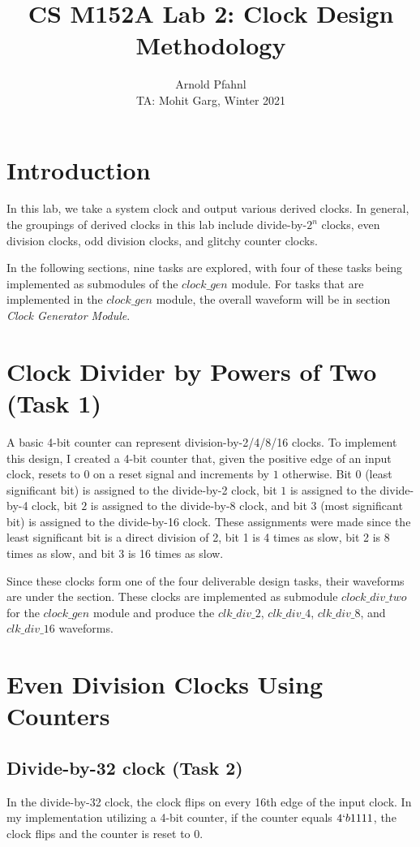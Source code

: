 \documentclass{article}
\title{CS M152A Lab 2: Clock Design Methodology}
\author{Arnold Pfahnl \\ \small{TA: Mohit Garg, Winter 2021}}
\date{}
\begin{document}
\maketitle
\tableofcontents

\section{Introduction}
In this lab, we take a system clock and output various derived clocks. In general, the groupings of derived clocks in this lab include divide-by-$2^n$ clocks, even division clocks, odd division clocks, and glitchy counter clocks.

In the following sections, nine tasks are explored, with four of these tasks being implemented as submodules of the $clock\_gen$ module. For tasks that are implemented in the $clock\_gen$ module, the overall waveform will be in section \emph{Clock Generator Module}.

\section{Clock Divider by Powers of Two (Task 1)}\label{sec:clk2}
A basic 4-bit counter can represent division-by-2/4/8/16 clocks. To implement this design, I created a 4-bit counter that, given the positive edge of an input clock, resets to $0$ on a reset signal and increments by $1$ otherwise. Bit $0$ (least significant bit) is assigned to the divide-by-2 clock, bit $1$ is assigned to the divide-by-4 clock, bit $2$ is assigned to the divide-by-8 clock, and bit $3$ (most significant bit) is assigned to the divide-by-16 clock. These assignments were made since the least significant bit is a direct division of 2, bit 1 is 4 times as slow, bit 2 is 8 times as slow, and bit 3 is 16 times as slow.

Since these clocks form one of the four deliverable design tasks, their waveforms are under the  section. These clocks are implemented as submodule $clock\_div\_two$ for the $clock\_gen$ module and produce the $clk\_div\_2$, $clk\_div\_4$, $clk\_div\_8$, and $clk\_div\_16$ waveforms.

\section{Even Division Clocks Using Counters}\label{sec:clkeven}
\subsection{Divide-by-32 clock (Task 2)}
In the divide-by-32 clock, the clock flips on every 16th edge of the input clock. In my implementation utilizing a 4-bit counter, if the counter equals $4`b1111$, the clock flips and the counter is reset to $0$.
\end{document}
